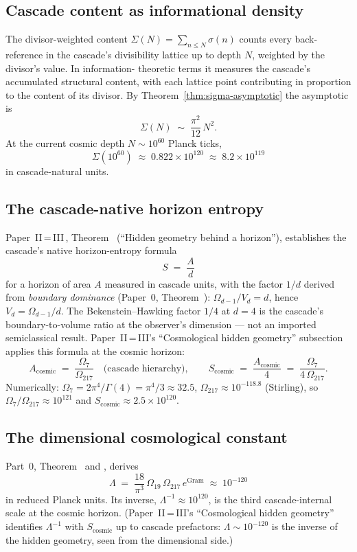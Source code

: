 \documentclass[11pt,a4paper]{article}
\begin{document}
\subsection*{Cascade content as informational density}

The divisor-weighted content $\Sigma(N) = \sum_{n \leq N} \sigma(n)$
counts every back-reference in the cascade's divisibility lattice up
to depth $N$, weighted by the divisor's value. In information-
theoretic terms it measures the cascade's accumulated structural
content, with each lattice point contributing in proportion to the
content of its divisor. By Theorem~\ref{thm:sigma-asymptotic} the
asymptotic is
\[
\Sigma(N) \;\sim\; \frac{\pi^2}{12}\, N^2.
\]
At the current cosmic depth $N \sim 10^{60}$ Planck ticks,
\[
\Sigma(10^{60}) \;\approx\; 0.822 \times 10^{120} \;\approx\; 8.2 \times 10^{119}
\]
in cascade-natural units.

\subsection*{The cascade-native horizon entropy}

Paper~II\,=\,III\,\cite{part23}, Theorem~
(``Hidden geometry behind a horizon''), establishes the cascade's
native horizon-entropy formula
\[
S \;=\; \frac{A}{d}
\]
for a horizon of area $A$ measured in cascade units, with the factor
$1/d$ derived from \emph{boundary dominance}
(Paper~0, Theorem~): $\Omega_{d-1}/V_d = d$,
hence $V_d = \Omega_{d-1}/d$. The Bekenstein--Hawking factor $1/4$ at
$d = 4$ is the cascade's boundary-to-volume ratio at the observer's
dimension --- not an imported semiclassical result. Paper~II\,=\,III's
``Cosmological hidden geometry'' subsection applies this formula at
the cosmic horizon:
\[
A_{\mathrm{cosmic}} \;=\; \frac{\Omega_7}{\Omega_{217}}
\quad\text{(cascade hierarchy)},
\qquad
S_{\mathrm{cosmic}} \;=\; \frac{A_{\mathrm{cosmic}}}{4} \;=\; \frac{\Omega_7}{4\,\Omega_{217}}.
\]
Numerically: $\Omega_7 = 2\pi^4/\Gamma(4) = \pi^4/3 \approx 32.5$,
$\Omega_{217} \approx 10^{-118.8}$ (Stirling), so $\Omega_7/\Omega_{217}
\approx 10^{121}$ and $S_{\mathrm{cosmic}} \approx 2.5 \times 10^{120}$.

\subsection*{The dimensional cosmological constant}

Part~0, Theorem~ and
, derives
\[
\Lambda \;=\; \frac{18}{\pi^3}\, \Omega_{19}\, \Omega_{217}\, e^{\mathrm{Gram}} \;\approx\; 10^{-120}
\]
in reduced Planck units. Its inverse,
$\Lambda^{-1} \approx 10^{120}$, is the third cascade-internal
scale at the cosmic horizon. (Paper~II\,=\,III's ``Cosmological
hidden geometry'' identifies $\Lambda^{-1}$ with $S_{\mathrm{cosmic}}$
up to cascade prefactors: $\Lambda \sim 10^{-120}$ is the inverse of
the hidden geometry, seen from the dimensional side.)
\end{document}
